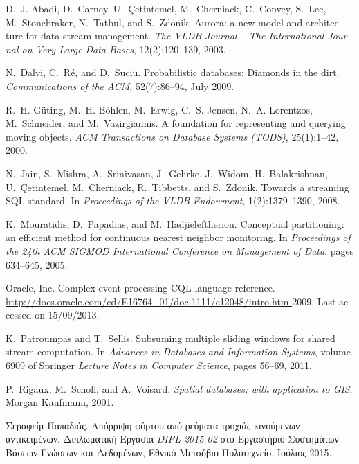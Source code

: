 
\begin{thebibliography}{1}


\bibitem{[ACC+03]} {\textlatin{
D.~J. Abadi, D.~Carney, U.~{\c{C}}etintemel, M.~Cherniack, C.~Convey, S.~Lee,  M.~Stonebraker, N.~Tatbul, and S.~Zdonik. 
Aurora: a new model and architecture for data stream management.
{\em The VLDB Journal -- The International Journal on Very Large Data Bases}, 12(2):120--139, 2003}}.

\bibitem{[DRS09]} {\textlatin{
N.~Dalvi, C.~R{\'e}, and D.~Suciu. Probabilistic databases: Diamonds in the dirt. {\em Communications of the ACM}, 52(7):86--94, July 2009}}.

\bibitem{[GBE+00]} {\textlatin{
R.~H. G{\"u}ting, M.~H. B{\"o}hlen, M.~Erwig, C.~S. Jensen, N.~A. Lorentzos,
  M.~Schneider, and M.~Vazirgiannis.
A foundation for representing and querying moving objects.
{\em ACM Transactions on Database Systems (TODS)}, 25(1):1--42, 2000}}.

\bibitem{[JMS+08]} {\textlatin{
N.~Jain, S.~Mishra, A.~Srinivasan, J.~Gehrke, J.~Widom, H.~Balakrishnan,
  U.~{\c{C}}etintemel, M.~Cherniack, R.~Tibbetts, and S.~Zdonik.
Towards a streaming {SQL} standard.
In {\em Proceedings of the VLDB Endowment}, 1(2):1379--1390, 2008}}.

\bibitem{[MHP05]} {\textlatin{
K.~Mouratidis, D.~Papadias, and M.~Hadjieleftheriou. 
Conceptual partitioning: an efficient method for continuous nearest
  neighbor monitoring.
In {\em Proceedings of the 24th ACM SIGMOD International
  Conference on Management of Data}, pages 634--645, 2005}}.

\bibitem{[Ora11]} {\textlatin{
{Oracle, Inc}.
Complex event processing {CQL} language reference.
\url{http://docs.oracle.com/cd/E16764_01/doc.1111/e12048/intro.htm }
  2009. Last accessed on 15/09/2013}}.

\bibitem{[PS11]} {\textlatin{
K.~Patroumpas and T.~Sellis.
Subsuming multiple sliding windows for shared stream computation.
In {\em Advances in
  Databases and Information Systems}, volume 6909 of Springer {\em Lecture Notes in
  Computer Science}, pages 56--69, 2011}}.

\bibitem{[RSV02]} {\textlatin{
P.~Rigaux, M.~Scholl, and A.~Voisard.
{\em Spatial databases: with application to {GIS}}.
Morgan Kaufmann, 2001}}.

\bibitem{[Pap15]}
Σεραφείμ Παπαδιάς.
Απόρριψη φόρτου από ρεύματα
  τροχιάς κινούμενων αντικειμένων. Διπλωματική Εργασία {\textlatin{\em DIPL-2015-02}} στο
Εργαστήριο Συστημάτων Βάσεων Γνώσεων και Δεδομένων, Εθνικό Μετσόβιο
  Πολυτεχνείο, Ιούλιος 2015.

\end{thebibliography}